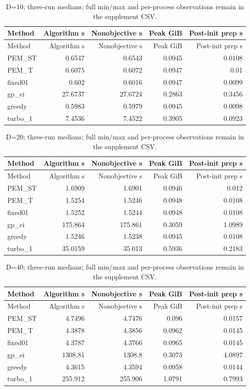 \documentclass[cmc,article,submit,moreauthors,pdftex]{Definitions/tsp}
\begin{document}
\begin{longtable}[]{@{}lrrrr@{}}
\caption{D=10; three-run medians; full min/max and per-process observations remain in the supplement CSV.}\tabularnewline
\toprule
Method & Algorithm s & Nonobjective s & Peak GiB & Post-init prep s \\
\midrule
\endfirsthead
\toprule
Method & Algorithm s & Nonobjective s & Peak GiB & Post-init prep s \\
\midrule
\endhead
PEM\_ST & 0.6547 & 0.6543 & 0.0945 & 0.0108 \\
PEM\_T & 0.6075 & 0.6072 & 0.0947 & 0.01 \\
fixed01 & 0.602 & 0.6016 & 0.0947 & 0.0099 \\
gp\_ei & 27.6737 & 27.6724 & 0.2863 & 0.3456 \\
greedy & 0.5983 & 0.5979 & 0.0945 & 0.0098 \\
turbo\_1 & 7.4536 & 7.4522 & 0.3905 & 0.0923 \\
\bottomrule
\end{longtable}

\begin{longtable}[]{@{}lrrrr@{}}
\caption{D=20; three-run medians; full min/max and per-process observations remain in the supplement CSV.}\tabularnewline
\toprule
Method & Algorithm s & Nonobjective s & Peak GiB & Post-init prep s \\
\midrule
\endfirsthead
\toprule
Method & Algorithm s & Nonobjective s & Peak GiB & Post-init prep s \\
\midrule
\endhead
PEM\_ST & 1.6909 & 1.6901 & 0.0946 & 0.012 \\
PEM\_T & 1.5254 & 1.5246 & 0.0948 & 0.0108 \\
fixed01 & 1.5252 & 1.5244 & 0.0948 & 0.0108 \\
gp\_ei & 175.864 & 175.861 & 0.3059 & 1.0989 \\
greedy & 1.5246 & 1.5238 & 0.0945 & 0.0108 \\
turbo\_1 & 35.0159 & 35.013 & 0.5936 & 0.2183 \\
\bottomrule
\end{longtable}

\begin{longtable}[]{@{}lrrrr@{}}
\caption{D=40; three-run medians; full min/max and per-process observations remain in the supplement CSV.}\tabularnewline
\toprule
Method & Algorithm s & Nonobjective s & Peak GiB & Post-init prep s \\
\midrule
\endfirsthead
\toprule
Method & Algorithm s & Nonobjective s & Peak GiB & Post-init prep s \\
\midrule
\endhead
PEM\_ST & 4.7496 & 4.7476 & 0.096 & 0.0157 \\
PEM\_T & 4.3878 & 4.3856 & 0.0962 & 0.0145 \\
fixed01 & 4.3787 & 4.3766 & 0.0965 & 0.0145 \\
gp\_ei & 1308.81 & 1308.8 & 0.3073 & 4.0897 \\
greedy & 4.3615 & 4.3594 & 0.0958 & 0.0144 \\
turbo\_1 & 255.912 & 255.906 & 1.0791 & 0.7993 \\
\bottomrule
\end{longtable}
\end{document}
